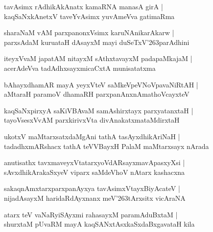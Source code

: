 \documentclass[twoside,12pt,openright]{book}
\def\S{\char'263}
\newcounter{shloka}[chapter]
\begin{document}
\begin{shloka}%
tavAsimx rAdhikAkAnatx kamaRNA manasA girA |\\
kaqSaNxkAnetxV taveYvAsimx yuvAmeVva gatimaRma 
\end{shloka}

\begin{shloka}%
sharaNaM vAM parxpanonxVsimx karuNAnikarAkarw |\\
parxsAdaM kuruataH dAsayxM mayi duSeTxV\S parAdhini
\end{shloka}

\begin{shloka}%
iteyxVvaM japatAM nitayxM sAthxtavayxM padapaMkajaM |\\
acerAdeVva tadAdhxsayxmicaCxtA munisatatxma
\end{shloka}

\begin{shloka}%
bAhayxdhamAR mayA yeyxVteV saMkeVpeVNoVpavaNiRtAH |\\
aMtaraH paramoV dhamaRH parxpanAnxnAmathoVcayxteV 
\end{shloka}

\begin{shloka}%
kaqSaNxpirxyA saKiVBAvaM samAshirxtayx parxyatanxtaH |\\
tayoVsesxVvAM parxkirivxVta divAnakatxmataMdirxtaH 
\end{shloka}

\begin{shloka}%
ukotxV maMtarxsatxdaMgAni tathA tasAyxdhikAriNaH |\\
tadadhxmARshacx tathA teVVBayxH PalaM maMtarxsayx nArada 
\end{shloka}

\begin{shloka}%
anutisathx tavxmaveyxVtatarxyoVdARsayxmavApasxyXsi |\\
sAvxdhikArakaSxyeV viparx saMdeVhoV nAtarx kashacxna
\end{shloka}

\begin{shloka}%
sakaqnAmxtarxparxpanAyxya tavAsimxVtayxBiyAcateV |\\
nijadAsayxM haridaRdAyxnanx meV\S tArxsitx vicAraNA 
\end{shloka}

\begin{shloka}%
atarx teV vaNaRyiSAyxmi rahasayxM paramAduBxtaM |\\
shurxtaM pUvaRM mayA kaqSANxtAsxkaSxdaBxgavataH kila 
\end{shloka}
\end{document}
